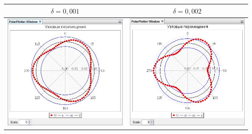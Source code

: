 \documentclass[14pt,oneside,final]{extreport}
\begin{document}
\begin{appendices}
\begin{table}[h!]
{{\begin{tabu}[]{|c|c|}
					\hline
					$ \delta = 0,001 $ & 	$ \delta = 0,002 $ \\ \hline
					\includegraphics[scale=0.55]{img/simulation-displ-test-graph1} & \includegraphics[scale=0.55]{img/simulation-displ-test-graph2} \\ 
					\hline
				\end{tabu}
			}
	}\end{table}	 
	

\end{appendices}
\end{document}
